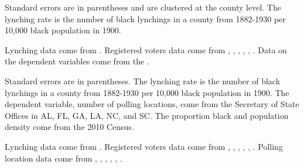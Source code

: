 \documentclass[AEJ, finalmode]{AEA}
\begin{document}
\begin{table}
			\caption{The Association between Lynching Rates and Differences in Attributes between Migrants and Stayers}
				
				\begin{tablenotes} 
				Standard errors are in parentheses and are clustered at the county level. The lynching rate is the number of black lynchings in a county from 1882-1930 per 10,000 black population in 1900.  
				\end{tablenotes}
				\begin{tablenotes}[Source]
				Lynching data come from . Registered voters data come from , , , , , . Data on the dependent variables come from the .
				\end{tablenotes}
			\label{migrationtable}%
\end{table}





\begin{table}
		\caption{The Association between Lynchings Rates and the Number of Polling Locations}
			
			\begin{tablenotes}   	
			Standard errors are in parentheses. The lynching rate is the number of black lynchings in a county from 1882-1930 per 10,000 black population in 1900. The dependent variable, number of polling locations, come from the Secretary of State Offices in AL, FL, GA, LA, NC, and SC. The proportion black and population density come from the 2010 Census.                       
			\end{tablenotes}
			\begin{tablenotes}[Source]
				Lynching data come from . Registered voters data come from , , , , , . Polling location data come from , , , , , .  
			\end{tablenotes}
		\label{tract}%
\end{table}
\end{document}
